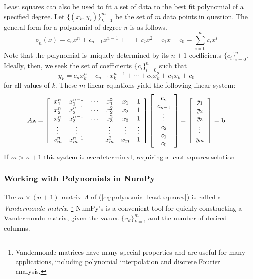 Least squares can also be used to fit a set of data to the best fit polynomial of a specified degree.
Let $\{(x_k, y_k)\}_{k=1}^m$ be the set of $m$ data points in question.
The general form for a polynomial of degree $n$ is as follows.
\[
p_n(x) = c_n x^n + c_{n-1} x^{n-1} + \cdots + c_2 x^2 + c_1 x + c_0 = \sum_{i=0}^n c_i x^i
\]
Note that the polynomial is uniquely determined by its $n+1$ coefficients $\{c_i\}_{i=0}^n$.
Ideally, then, we seek the set of coefficients $\{c_i\}_{i=0}^n$ such that
\[
y_k = c_n x_k^n + c_{n-1} x_k^{n-1} + \cdots + c_2 x_k^2 + c_1 x_k + c_0
\]
for all values of $k$.
These $m$ linear equations yield the following linear system:
\begin{equation}
A\mathbf{x} =
\left[\begin{array}{cccccc}
x_1^n & x_1^{n-1} & \cdots & x_1^2 & x_1 & 1 \\
x_2^n & x_2^{n-1} & \cdots & x_2^2 & x_2 & 1 \\
x_3^n & x_3^{n-1} & \cdots & x_3^2 & x_3 & 1 \\
\vdots & \vdots & & \vdots & \vdots & \vdots \\
x_m^n & x_m^{n-1} & \cdots & x_m^2 & x_m & 1 \\
\end{array}\right]
\left[\begin{array}{c}
c_n \\ c_{n-1} \\ \vdots \\ c_2 \\ c_1 \\ c_0
\end{array}\right]
=
\left[\begin{array}{c} y_1 \\ y_2 \\ y_3 \\ \vdots \\ y_m \end{array}\right]
= \mathbf{b}
\label{eq:polynomial-least-squares}
\end{equation}
%
If $m > n+1$ this system is overdetermined, requiring a least squares solution.

\subsubsection*{Working with Polynomials in NumPy} %

The $m \times (n+1)$ matrix $A$ of (\ref{eq:polynomial-least-squares}) is called a \emph{Vandermonde matrix}.%
\footnote{Vandermonde matrices have many special properties and are useful for many applications, including polynomial interpolation and discrete Fourier analysis.}
NumPy's  is a convenient tool for quickly constructing a Vandermonde matrix, given the values $\{x_k\}_{k=1}^m$ and the number of desired columns.

